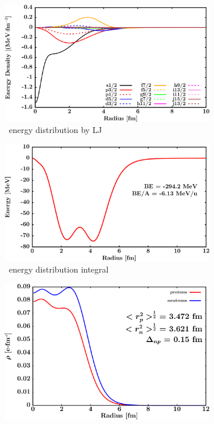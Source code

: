 \begin{figure}[hbtp]
    \begin{subfigure}{0.45\textwidth}
        \centering
        \includegraphics[width=\linewidth]{figures/ca48_EnergyDist.png}
        \caption{\caEight\ energy distribution by LJ}
        \label{DOMFitData_ca48_proton_energyDistInt}
    \end{subfigure}\hspace{6pt}
    \begin{subfigure}{0.45\textwidth}
        \centering
        \includegraphics[width=\linewidth]{figures/ca48_EnergyDistIntegral.png}
        \caption{\caEight\ energy distribution integral}
        \label{DOMFitData_ca48_neutron_energyDistInt}
    \end{subfigure}\vspace{0.4in}
    \begin{subfigure}{0.70\textwidth}
        \centering
        \includegraphics[width=\linewidth]{figures/ca48_matterDensity.png}

\end{subfigure}
\end{figure}
